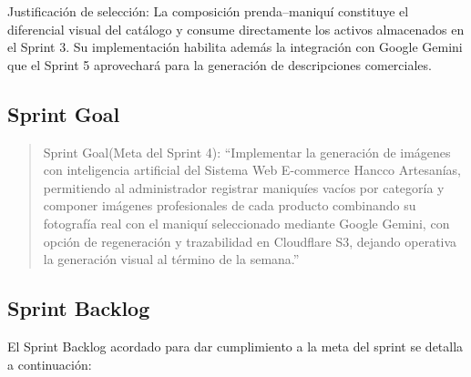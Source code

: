 \documentclass[12pt,a4paper]{article}
\begin{document}
Justificación de selección: La composición prenda--maniquí constituye el diferencial visual del catálogo y consume directamente los activos almacenados en el Sprint 3. Su implementación habilita además la integración con Google Gemini que el Sprint 5 aprovechará para la generación de descripciones comerciales.

\subsection*{Sprint Goal}

\begin{quote}
Sprint Goal(Meta del Sprint 4): ``Implementar la generación de imágenes con inteligencia artificial del Sistema Web E-commerce Hancco Artesanías, permitiendo al administrador registrar maniquíes vacíos por categoría y componer imágenes profesionales de cada producto combinando su fotografía real con el maniquí seleccionado mediante Google Gemini, con opción de regeneración y trazabilidad en Cloudflare S3, dejando operativa la generación visual al término de la semana.''
\end{quote}

\subsection*{Sprint Backlog}

El Sprint Backlog acordado para dar cumplimiento a la meta del sprint se detalla a continuación:
\end{document}
